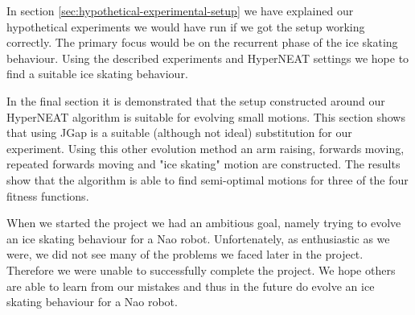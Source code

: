 \documentclass[a4paper,10pt]{article}
\begin{document}
In section \ref{sec:hypothetical-experimental-setup} we have explained our hypothetical experiments we would have run if we got the setup working correctly. The primary focus would be on the recurrent phase of the ice skating behaviour. Using the described experiments and HyperNEAT settings we hope to find a suitable ice skating behaviour.

In the final section it is demonstrated that the setup constructed around our HyperNEAT algorithm is suitable for evolving small motions. This section shows that using JGap is a suitable (although not ideal) substitution for our experiment. Using this other evolution method an arm raising, forwards moving, repeated forwards moving and "ice skating" motion are constructed. The results show that the algorithm is able to find semi-optimal motions for three of the four fitness functions.

When we started the project we had an ambitious goal, namely trying to evolve an ice skating behaviour for a Nao robot. Unfortenately, as enthusiastic as we were, we did not see many of the problems we faced later in the project. Therefore we were unable to successfully complete the project. We hope others are able to learn from our mistakes and thus in the future do evolve an ice skating behaviour for a Nao robot.



\end{document}
